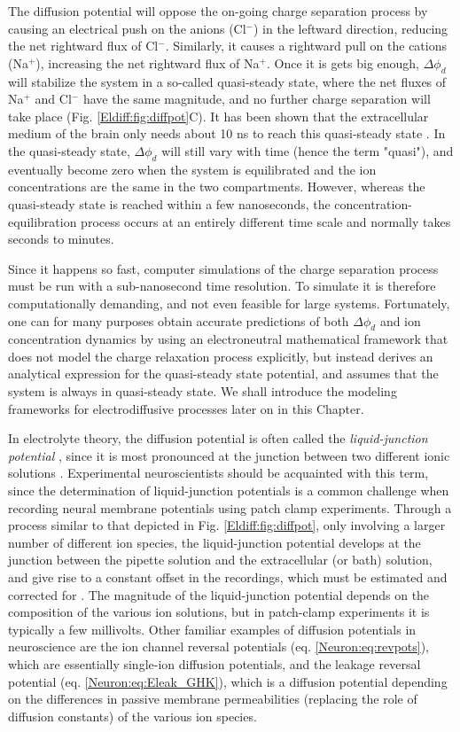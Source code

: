 The diffusion potential will oppose the on-going charge separation process by causing an electrical push on the anions (Cl$^-$) in the leftward direction, reducing the net rightward flux of Cl$^-$. Similarly, it causes a rightward pull on the cations (Na$^+$), increasing the net rightward flux of Na$^+$. Once it is gets big enough, $\Delta \phi_d$ will stabilize the system in a so-called quasi-steady state, where the net fluxes of Na$^+$ and Cl$^-$ have the same magnitude, and no further charge separation will take place (Fig. \ref{Eldiff:fig:diffpot}C). It has been shown that the extracellular medium of the brain only needs about 10 ns to reach this quasi-steady state \citep{Solbra2018}. In the quasi-steady state, $\Delta \phi_d$ will still vary with time (hence the term "quasi"), and eventually become zero when the system is equilibrated and the ion concentrations are the same in the two compartments. However, whereas the quasi-steady state is reached within a few nanoseconds, the concentration-equilibration process occurs at an entirely different time scale and normally takes seconds to minutes. 

Since it happens so fast, computer simulations of the charge separation process must be run with a sub-nanosecond time resolution. To simulate it is therefore computationally demanding, and not even feasible for large systems. Fortunately, one can for many purposes obtain accurate predictions of both $\Delta \phi_d$ and ion concentration dynamics by using an electroneutral mathematical framework that does not model the charge relaxation process explicitly, but instead derives an analytical expression for the quasi-steady state potential, and assumes that the system is always in quasi-steady state. We shall introduce the modeling frameworks for electrodiffusive processes later on in this Chapter. 

In electrolyte theory, the diffusion potential is often called the \textit{liquid-junction potential} , since it is most pronounced at the junction between two different ionic solutions \citep{Aguilella1987, Sokalski2001}. Experimental neuroscientists should be acquainted with this term, since the determination of liquid-junction potentials is a common challenge when recording neural membrane potentials using patch clamp experiments. Through a process similar to that depicted in Fig. \ref{Eldiff:fig:diffpot}, only involving a larger number of different ion species, the liquid-junction potential develops at the junction between the pipette solution and the extracellular (or bath) solution, and give rise to a constant offset in the recordings, which must be estimated and corrected for \citep{barry1991,neher1992}. The magnitude of the liquid-junction potential depends on the composition of the various ion solutions, but in patch-clamp experiments it is typically a few millivolts. Other familiar examples of diffusion potentials in neuroscience are the ion channel reversal potentials (eq. \ref{Neuron:eq:revpots}), which are essentially single-ion diffusion potentials, and the leakage reversal potential (eq. \ref{Neuron:eq:Eleak_GHK}), which is a diffusion potential depending on the differences in passive membrane permeabilities (replacing the role of diffusion constants) of the various ion species. 

